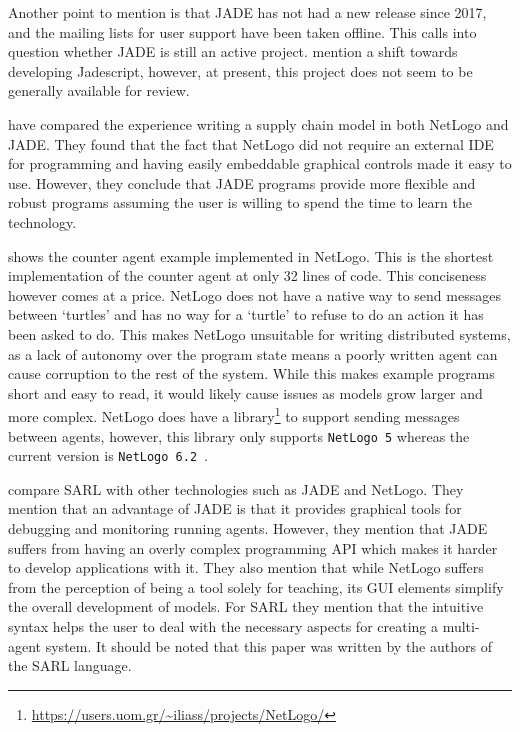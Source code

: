 Another point to mention is that JADE has not had a new release since 2017, and the mailing lists for user support have been taken offline.
This calls into question whether JADE is still an active project.
 mention a shift towards developing Jadescript, however, at present, this project does not seem to be generally available for review.

 have compared the experience writing a supply chain model in both NetLogo and JADE\@.
They found that the fact that NetLogo did not require an external IDE for programming and having easily embeddable graphical controls made it easy to use.
However, they conclude that JADE programs provide more flexible and robust programs assuming the user is willing to spend the time to learn the technology.

 shows the counter agent example implemented in NetLogo.
This is the shortest implementation of the counter agent at only 32 lines of code.
This conciseness however comes at a price.
NetLogo does not have a native way to send messages between `turtles' and has no way for a `turtle' to refuse to do an action it has been asked to do.
This makes NetLogo unsuitable for writing distributed systems, as a lack of autonomy over the program state means a poorly written agent can cause corruption to the rest of the system.
While this makes example programs short and easy to read, it would likely cause issues as models grow larger and more complex.
NetLogo does have a library\footnote{\url{https://users.uom.gr/~iliass/projects/NetLogo/}} to support sending messages between agents, however, this library only supports \verb|NetLogo 5| whereas the current version is \verb|NetLogo 6.2|~\cite{sakellariou2008enhancing}.

 compare SARL with other technologies such as JADE and NetLogo.
They mention that an advantage of JADE is that it provides graphical tools for debugging and monitoring running agents.
However, they mention that JADE suffers from having an overly complex programming API which makes it harder to develop applications with it.
They also mention that while NetLogo suffers from the perception of being a tool solely for teaching, its GUI elements simplify the overall development of models.
For SARL they mention that the intuitive syntax helps the user to deal with the necessary aspects for creating a multi-agent system.
It should be noted that this paper was written by the authors of the SARL language.

